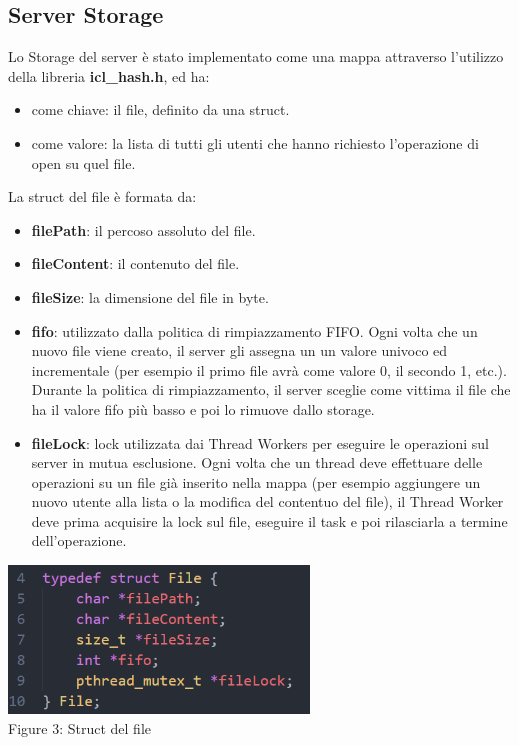 \documentclass{article}
\begin{document}
\subsection{Server Storage}

Lo Storage del server è stato implementato come una mappa attraverso l'utilizzo della libreria \textbf{icl\_hash.h}, ed ha:
\begin{itemize}
    \itemsep 0em 
    \item come chiave: il file, definito da una struct.
    \item come valore: la lista di tutti gli utenti che hanno richiesto l'operazione di open su quel file. 
\end{itemize}

La struct del file è formata da:
\begin{itemize}
    \itemsep 0em 
    \item \textbf{filePath}: il percoso assoluto del file.
    \item \textbf{fileContent}: il contenuto del file. 
    \item \textbf{fileSize}: la dimensione del file in byte.
    \item \textbf{fifo}: utilizzato dalla politica di rimpiazzamento FIFO. Ogni volta che un nuovo file viene creato, il server gli assegna un
    un valore univoco ed incrementale (per esempio il primo file avrà come valore 0, il secondo 1, etc.). Durante la politica di rimpiazzamento, il server sceglie
    come vittima il file che ha il valore fifo più basso e poi lo rimuove dallo storage.
    \item \textbf{fileLock}: lock utilizzata dai Thread Workers per eseguire le operazioni sul server in mutua esclusione. Ogni volta che un thread deve effettuare delle
    operazioni su un file già inserito nella mappa (per esempio aggiungere un nuovo utente alla lista o la modifica del contentuo del file), il Thread Worker deve prima acquisire
    la lock sul file, eseguire il task e poi rilasciarla a termine dell'operazione.
\end{itemize}

\begin{center}
    \includegraphics[width=80mm]{file}   
    \\Figure 3: Struct del file
\end{center}
\end{document}
